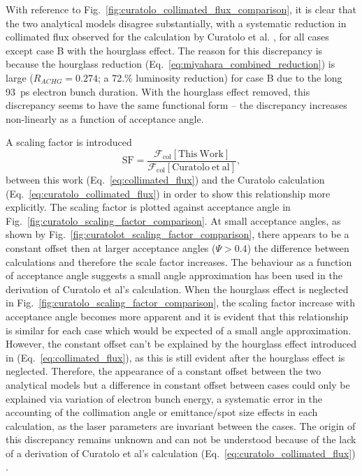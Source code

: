\documentclass[../main.tex]{subfiles}
\begin{document}
With reference to Fig.~\ref{fig:curatolo_collimated_flux_comparison}, it is clear that the two analytical models disagree substantially, with a systematic reduction in collimated flux observed for the calculation by Curatolo et al. \cite{curatolo2017analytical}, for all cases except case B with the hourglass effect. The reason for this discrepancy is because the hourglass reduction (Eq.~\ref{eq:miyahara_combined_reduction}) is large ($R_{ACHG} = 0.274$; a 72.\% luminosity reduction) for case B due to the long 93~\si{\pico\second} electron bunch duration. With the hourglass effect removed, this discrepancy seems to have the same functional form -- the discrepancy increases non-linearly as a function of acceptance angle.

A scaling factor is introduced 
\begin{equation}
\mathrm{SF} = \frac{\mathcal{F}_{\mathrm{col}}\left[\mathrm{This~ Work}\right]}{\mathcal{F}_{\mathrm{col}}\left[\mathrm{Curatolo~et~ al}\right]},
\label{eq:curatolo_scaling_factor}
\end{equation}
between this work (Eq.~\ref{eq:collimated_flux}) and the Curatolo calculation (Eq.~\ref{eq:curatolo_collimated_flux}) in order to show this relationship more explicitly. The scaling factor is plotted against acceptance angle in Fig.~\ref{fig:curatolo_scaling_factor_comparison}. At small acceptance angles, as shown by Fig.~\ref{fig:curatolot_scaling_factor_comparison}, there appears to be a constant offset then at larger acceptance angles ($\Psi > 0.4$) the difference between calculations and therefore the scale factor increases. The behaviour as a function of acceptance angle suggests a small angle approximation has been used in the derivation of Curatolo et al's \cite{curatolo2017analytical} calculation. When the hourglass effect is neglected in Fig.~\ref{fig:curatolo_scaling_factor_comparison}, the scaling factor increase with acceptance angle becomes more apparent and it is evident that this relationship is similar for each case which would be expected of a small angle approximation. However, the constant offset can't be explained by the hourglass effect introduced in (Eq.~\ref{eq:collimated_flux}), as this is still evident after the hourglass effect is neglected. Therefore, the appearance of a constant offset between the two analytical models but a difference in constant offset between cases could only be explained via variation of electron bunch energy, a systematic error in the accounting of the collimation angle or emittance/spot size effects in each calculation, as the laser parameters are invariant between the cases. The origin of this discrepancy remains unknown and can not be understood because of the lack of a derivation of Curatolo et al's calculation (Eq.~\ref{eq:curatolo_collimated_flux}) \cite{curatolo2017analytical}. 
\end{document}
